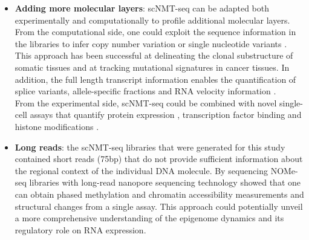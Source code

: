 \begin{itemize}
	\item \textbf{Adding more molecular layers}: scNMT-seq can be adapted both experimentally and computationally to profile additional molecular layers. From the computational side, one could exploit the sequence information in the libraries to infer copy number variation or single nucleotide variants \cite{Poirion2018,Fan2018,McCarthy2018,Enge2017}. This approach has been successful at delineating the clonal substructure of somatic tissues and at tracking mutational signatures in cancer tissues. In addition, the full length transcript information enables the quantification of splice variants\cite{Huang2017}, allele-specific fractions\cite{Deng2014} and RNA velocity information \cite{LaManno2018}.\\
	From the experimental side, scNMT-seq could be combined with novel single-cell assays that quantify protein expression \cite{Stoeckius2017}, transcription factor binding \cite{Moudgil2019} and histone modifications \cite{Kaya-Okur2019}.


	\item \textbf{Long reads}: the scNMT-seq libraries that were generated for this study contained short reads (75bp) that do not provide sufficient information about the regional context of the individual DNA molecule. By sequencing NOMe-seq libraries with long-read nanopore sequencing technology \cite{Lee2018} showed that one can obtain phased methylation and chromatin accessibility measurements and structural changes from a single assay. This approach could potentially unveil a more comprehensive understanding of the epigenome dynamics and its regulatory role on RNA expression.

\end{itemize}


